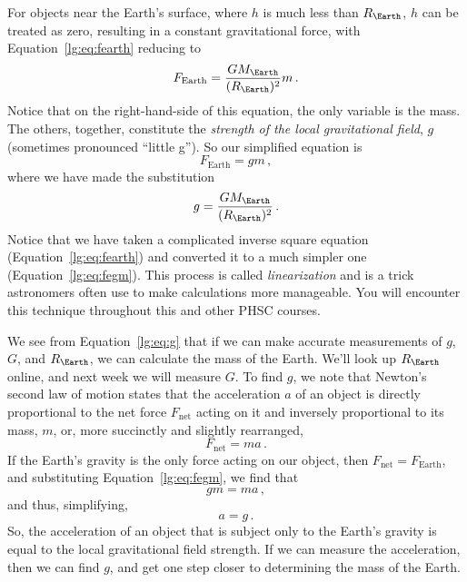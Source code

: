 For objects near the Earth's surface, where $h$ is much less than $R_\Earth$, $h$ can be treated as zero, resulting in a constant gravitational force, with Equation~\ref{lg:eq:fearth} reducing to
\begin{equation}\label{lg:eq:fearthred}
F_\textrm{Earth} = \frac{G M_\Earth}{(R_\Earth)^2} m \,.
\end{equation}
Notice that on the right-hand-side of this equation, the only variable is the mass. The others, together, constitute the \textit{strength of the local gravitational field}, $g$ (sometimes pronounced ``little g''). So our simplified equation is
\begin{equation}\label{lg:eq:fegm}
 F_\textrm{Earth} = g m \,,
\end{equation}
where we have made the substitution
\begin{equation}\label{lg:eq:g}
g = \dfrac{G M_\Earth}{(R_\Earth)^2} \, .
\end{equation}
Notice that we have taken a complicated inverse square equation (Equation~\ref{lg:eq:fearth}) and
converted it to a much simpler one (Equation~\ref{lg:eq:fegm}). This process is called \textit{linearization} and is a
trick astronomers often use to make calculations more manageable. You will encounter
this technique throughout this and other PHSC courses.

We see from Equation~\ref{lg:eq:g} that if we can make accurate measurements of $g$, $G$, and $R_\Earth$, we can calculate the mass of the Earth. We'll look up $R_\Earth$ online, and next week we will measure $G$. To find $g$, we note that Newton's second law of motion states that the acceleration $a$ of an object is directly proportional to the net force $F_\textrm{net}$ acting on it and inversely proportional to its mass, $m$, or, more succinctly and slightly rearranged,
\begin{equation}
 F_\textrm{net} = m a \,.
\end{equation}
If the Earth's gravity is the only force acting on our object, then $F_\textrm{net} = F_\textrm{Earth}$, and substituting Equation~\ref{lg:eq:fegm}, we find that
\begin{equation}
 g m = m a \,,
\end{equation}
and thus, simplifying,
\begin{equation}
 a = g \,.
\end{equation}
So, the acceleration of an object that is subject only to the Earth's gravity is equal to the local gravitational field strength. If we can measure the acceleration, then we can find $g$, and get one step closer to determining the mass of the Earth.

